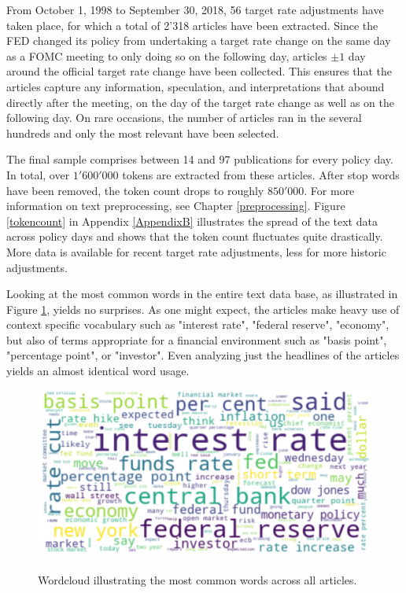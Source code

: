 \documentclass[11pt,a4paper,english,oneside]{book}
\numberwithin{equation}{chapter}
\begin{document}
From October 1, 1998 to September 30, 2018, 56 target rate adjustments have taken place, for which a total of 2'318 articles have been extracted. Since the FED changed its policy from undertaking a target rate change on the same day as a FOMC meeting to only doing so on the following day, articles $\pm1$ day around the official target rate change have been collected. This ensures that the articles capture any information, speculation, and interpretations that abound directly after the meeting, on the day of the target rate change as well as on the following day. On rare occasions, the number of articles ran in the several hundreds and only the most relevant have been selected. 

The final sample comprises between 14 and 97 publications for every policy day. In total, over $1'600'000$ tokens are extracted from these articles. After stop words have been removed, the token count drops to roughly $850'000$. For more information on text preprocessing, see Chapter \ref{preprocessing}. Figure \ref{tokencount} in Appendix \ref{AppendixB} illustrates the spread of the text data across policy days and shows that the token count fluctuates quite drastically. More data is available for recent target rate adjustments, less for more historic adjustments.

Looking at the most common words in the entire text data base, as illustrated in Figure \ref{wcloud}, yields no surprises. As one might expect, the articles make heavy use of context specific vocabulary such as "interest rate", "federal reserve", "economy", but also of terms appropriate for a financial environment such as "basis point", "percentage point", or "investor". Even analyzing just the headlines of the articles yields an almost identical word usage. %

\begin{figure}
	\caption{Wordcloud illustrating the most common words across all articles.}
	\centering
	\includegraphics[scale=0.2]{Images/wordcloud.pdf}
	\label{wcloud}
\end{figure}
\end{document}
